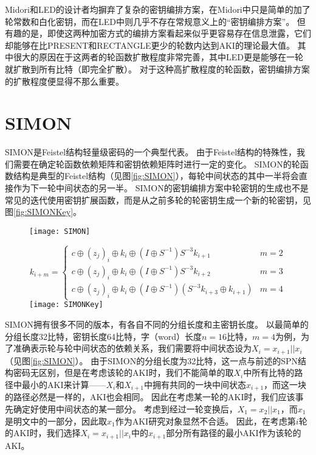 Midori和LED的设计者均摒弃了复杂的密钥编排方案，在Midori中只是简单的加了轮常数和白化密钥，而在LED中则几乎不存在常规意义上的“密钥编排方案”。
但有趣的是，即使这两种加密方式的编排方案看起来似乎更容易存在信息泄露，它们却能够在比PRESENT和RECTANGLE更少的轮数内达到AKI的理论最大值。
其中很大的原因在于这两者的轮函数扩散程度非常完善，其中LED更是能够在一轮就扩散到所有比特（即完全扩散）。
对于这种高扩散程度的轮函数，密钥编排方案的扩散程度便显得不那么重要。

\section{SIMON}
SIMON是Feistel结构轻量级密码的一个典型代表。
由于Feistel结构的特殊性，我们需要在确定轮函数依赖矩阵和密钥依赖矩阵时进行一定的变化。
SIMON的轮函数结构是典型的Feistel结构（见图\ref{fig:SIMON}），每轮中间状态的其中一半将会直接作为下一轮中间状态的另一半。
SIMON的密钥编排方案中轮密钥的生成也不是常见的迭代使用密钥扩展函数，而是从之前多轮的轮密钥生成一个新的轮密钥，见图\ref{fig:SIMONKey}。

\begin{figure}[htbp]
    \centering
    \texttt{[image: SIMON]}
\end{figure}

\begin{figure}[htbp]
    \centering
    $$k_{i+m}=\begin{cases}
        c\oplus(z_j)_i\oplus k_i\oplus(I\oplus S^{-1})S^{-3}k_{i+1} & m=2\\
        c\oplus(z_j)_i\oplus k_i\oplus(I\oplus S^{-1})S^{-3}k_{i+2} & m=3\\
        c\oplus(z_j)_i\oplus k_i\oplus(I\oplus S^{-1})(S^{-3}k_{i+3}\oplus k_{i+1}) & m=4
    \end{cases}$$
    \texttt{[image: SIMONKey]}
\end{figure}

SIMON拥有很多不同的版本，有各自不同的分组长度和主密钥长度。
以最简单的分组长度32比特，密钥长度64比特，字（word）长度$n=16$比特，$m=4$为例，为了准确表示轮与轮中间状态的依赖关系，我们需要将中间状态设为$X_i=x_{i+1}||x_i$（见图\ref{fig:SIMON}）。
由于SIMON的分组长度为32比特，这一点与前述的SPN结构密码无区别，但是在考虑该轮的AKI时，我们不能简单的取$X_i$中所有比特的路径中最小的AKI来计算——$X_i$和$X_{i+1}$中拥有共同的一块中间状态$x_{i+1}$，而这一块的路径必然是一样的，AKI也会相同。
因此在考虑某一轮的AKI时，我们应该事先确定好使用中间状态的某一部分。
考虑到经过一轮变换后，$X_1=x_2||x_1$，而$x_1$是明文中的一部分，因此取$x_1$作为AKI研究对象显然不合适。
因此，在考虑第$i$轮的AKI时，我们选择$X_i=x_{i+1}||x_i$中的$x_{i+1}$部分所有路径的最小AKI作为该轮的AKI。

